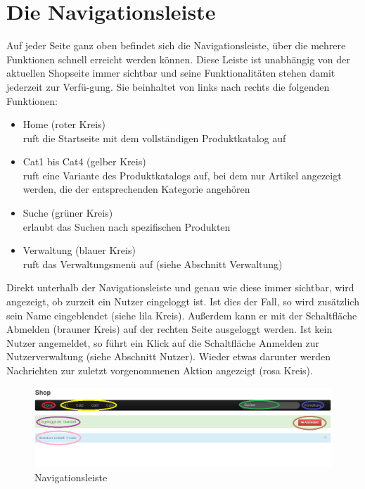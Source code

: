 \section{Die Navigationsleiste}
Auf jeder Seite ganz oben befindet sich die Navigationsleiste, über die mehrere Funktionen schnell erreicht werden können. Diese Leiste ist unabhängig von der aktuellen Shopseite immer sichtbar und seine Funktionalitäten stehen damit jederzeit zur Ver\-fü-gung. Sie beinhaltet von links nach rechts die folgenden Funktionen:
\begin{itemize}
  \item Home (roter Kreis) \\
        ruft die Startseite mit dem vollständigen Produktkatalog auf
  \vspace*{-0.5em}
  \item Cat1 bis Cat4 (gelber Kreis) \\
        ruft eine Variante des Produktkatalogs auf, bei dem nur Artikel angezeigt werden, die der entsprechenden Kategorie angehören        
  \vspace*{-0.5em}
  \item Suche (grüner Kreis) \\
        erlaubt das Suchen nach spezifischen Produkten
  \vspace*{-0.5em}
  \item Verwaltung (blauer Kreis) \\
        ruft das Verwaltungsmenü auf (siehe Abschnitt Verwaltung)
\end{itemize}
Direkt unterhalb der Navigationsleiste und genau wie diese immer sichtbar, wird angezeigt, ob zurzeit ein Nutzer eingeloggt ist. Ist dies der Fall, so wird zusätzlich sein Name eingeblendet  (siehe lila Kreis). Außerdem  kann er mit der Schaltfläche Abmelden (brauner Kreis) auf der rechten Seite ausgeloggt werden.  Ist kein Nutzer angemeldet, so führt ein Klick auf die Schaltfläche Anmelden zur Nutzerverwaltung (siehe Abschnitt Nutzer). 
Wieder etwas darunter werden Nachrichten zur zuletzt vorgenommenen Aktion angezeigt (rosa Kreis).

\begin{figure}[h!]
  \centering
  \includegraphics[width=\textwidth]{UserManual/Navi.png}
  \caption{Navigationsleiste}
  \label{fig:Navigationsleiste}
\end{figure}



